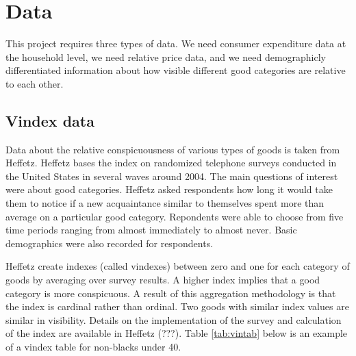 \documentclass{article}
\begin{document}
%
%
\section{Data}
This project requires three types of data.  We need consumer expenditure data at the household level, we need relative price data, and we need demographicly differentiated information about how visible different good categories are relative to each other. 
\subsection{Vindex data}
Data about the relative  conspicuousness of  various types of goods is taken from Heffetz.  
Heffetz bases the index on randomized telephone surveys conducted in the United States in several waves around 2004.
The main questions of interest were about good categories.
Heffetz asked respondents how long it would take them to notice if a new acquaintance similar to themselves spent more than average on a particular good category.
Repondents were able to choose from five time periods ranging from almost immediately to almost never.  
Basic demographics were also recorded for respondents.  

Heffetz create indexes (called vindexes) between zero and one for each category of goods by averaging over survey results.  
A higher index implies that a good category is  more conspicuous. 
A result of this aggregation methodology is that the index is cardinal rather than ordinal.  Two goods with similar index values are similar in visibility.  Details on the implementation of the survey and calculation of the index are available in Heffetz (???).
Table \ref{tab:vintab} below is an example of a vindex table for non-blacks under 40.
\end{document}
